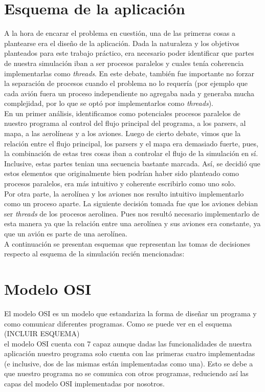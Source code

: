 \documentclass[a4paper,10pt]{article}
\begin{document}
\newpage
\section{Esquema de la aplicación}

A la hora de encarar el problema en cuestión, una de las primeras cosas a plantearse era el diseño de la aplicación. Dada la naturaleza y los objetivos planteados para este
 trabajo práctico, era necesario poder identificar que partes de nuestra simulación iban a ser procesos paralelos y cuales tenía coherencia implementarlas como \textit{threads}.
  En este debate, también fue importante no forzar la separación de procesos cuando el problema no lo requería (por ejemplo que cada avión fuera un proceso independiente no agregaba 
  nada y generaba mucha complejidad, por lo que se optó por implementarlos como \textit{threads}).\\ 

En un primer análisis, identificamos como potenciales procesos paralelos de nuestro programa al control del flujo principal del programa, a los parsers, al mapa, a las aerolíneas y
 a los aviones. Luego de cierto debate, vimos que la relación entre el flujo principal, los parsers y el mapa era demasiado fuerte, pues, la combinación de estas tres cosas iban a 
 controlar el flujo de la simulación en sí. Inclusive, estas partes tenian una secuencia bastante marcada. Así, se decidió que estos elementos que originalmente bien podrían haber 
 sido planteado como procesos paralelos, era más intuitivo y coherente escribirlo como uno solo.\\

Por otra parte, la aerolínea y los aviones nos resulto intuitivo implementarlo como un proceso aparte. La siguiente decisión tomada fue que los aviones debian ser \textit{threads}
 de los procesos aerolinea. Pues nos resultó necesario implementarlo de esta manera ya que la relación entre una aerolínea y sus aviones era constante, ya que un avión es parte
  de una aerolínea.\\

A continuación se presentan esquemas que representan las tomas de decisiones respecto al esquema de la simulación recién mencionadas:

\newpage
\section{Modelo OSI}

El modelo OSI es un modelo que estandariza la forma de diseñar un programa y como comunicar diferentes programas. Como se puede ver en el esquema\\
 (INCLUIR ESQUEMA)\\
 el modelo OSI cuenta con 7 capaz aunque dadas las funcionalidades de nuestra aplicación nuestro programa solo cuenta con las primeras cuatro implementadas (e inclusive, dos de las
  mismas están implementadas como una). Esto se debe a que nuestro programa no se comunica con otros programas, reduciendo así las capas del modelo OSI implementadas por nosotros.\\
\end{document}
